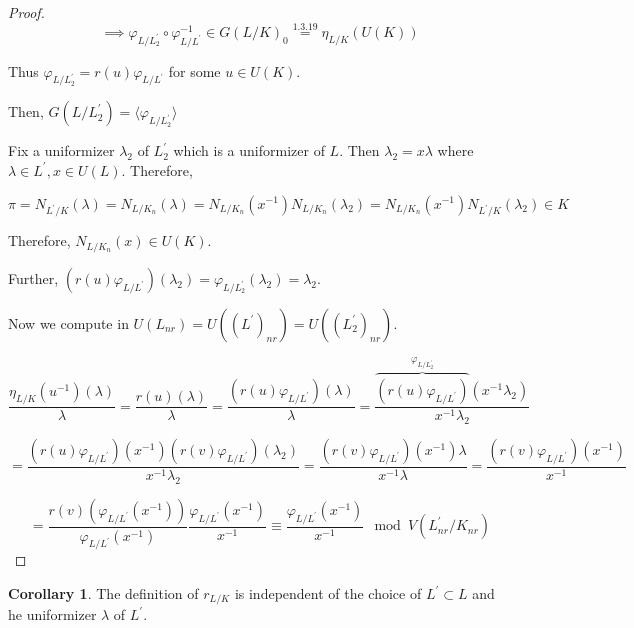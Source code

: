\documentclass{article}
\theoremstyle{definition}
\numberwithin{theorem}{subsection}
\newtheorem{corollary}[theorem]{Corollary}
\begin{document}
\begin{proof}
        \[
            \implies \varphi_{L / L_2^{\prime}} \circ \varphi_{L / L^{\prime}} ^{-1} \in G(L / K)_0 \overset{1.3.19}{=} \eta_{L / K}(U(K))
        \]

        Thus \(\varphi_{L / L_2^{\prime}} = r(u) \varphi_{L / L^{\prime}}\) for some \(u \in U(K)\).
        
        Then, \(G(L / L_2^{\prime}) = \langle \varphi_{L / L_2^{\prime}} \rangle \) 

        Fix a uniformizer \(\lambda_2\) of \(L_2^{\prime}\) which is a uniformizer of \(L\). Then \(\lambda_2 = x \lambda\) where \(\lambda\in L^{\prime}, x \in U(L)\). Therefore,

        \[
            \pi  = N_{L^{\prime} / K}(\lambda) = N_{L / K_n}(\lambda) = N_{L / K_n}(x ^{-1}) N_{L / K_n}(\lambda_2) = N_{L / K_n}(x ^{-1}) N_{L^{\prime}  / K}(\lambda_2) \in K
        \]

        Therefore, \(N_{L / K_n}(x) \in U(K)\).

        Further, \((r(u)\varphi_{L / L^{\prime}})(\lambda_2) = \varphi_{L / L_2^{\prime}}(\lambda_2) = \lambda_2\).

        Now we compute in \(U(L_{nr}) = U((L^{\prime})_{nr})=U((L_2^{\prime})_{nr})\).
        
        \[
            \frac{\eta_{L / K}(u ^{-1})(\lambda)}{\lambda} = \frac{r(u)(\lambda)}{\lambda} = \frac{(r(u)\varphi_{L / L^{\prime}})(\lambda)}{\lambda} = \frac{\overbrace{(r(u)\varphi_{L / L^{\prime}})}^{\varphi_{L / L_2^{\prime}}}(x ^{-1} \lambda_2)}{x ^{-1} \lambda_2}
        \]

        \[
            = \frac{(r(u)\varphi_{L / L^{\prime}})(x ^{-1})(r(v)\varphi_{L / L^{\prime}})(\lambda_2)}{x ^{-1} \lambda_2} = \frac{(r(v)\varphi_{L / L^{\prime}})(x ^{-1}) \lambda}{x ^{-1}  \lambda} = \frac{(r(v)\varphi_{L / L^{\prime}})(x ^{-1})}{x ^{-1}}
        \]

        \[
            = \frac{r(v) (\varphi_{L / L^{\prime}}(x ^{-1}))}{\varphi_{L / L^{\prime}}(x ^{-1})} \frac{\varphi_{L / L^{\prime}}(x ^{-1})}{x ^{-1}} \equiv \frac{\varphi_{L / L^{\prime}}(x ^{-1})}{x ^{-1}} \mod V(L_{nr}^{\prime} / K_{nr})
        \]

    \end{proof}

    \begin{corollary}
        The definition of \(r_{L / K}\) is independent of the choice of \(L^{\prime} \subset L\) and he uniformizer \(\lambda\) of \(L^{\prime}\).
    \end{corollary}
\end{document}
